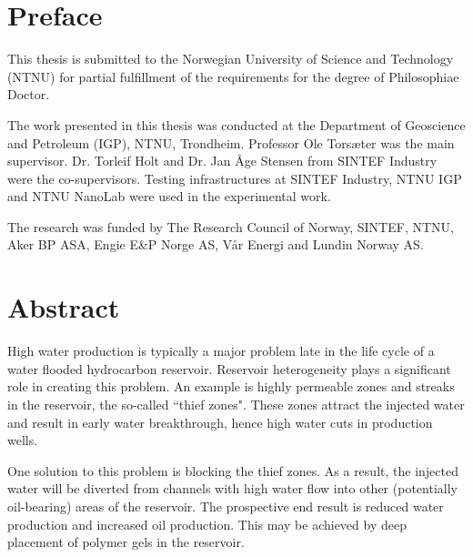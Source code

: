 
\clearpage{\thispagestyle{empty}\cleardoublepage}
\setcounter{page}{1}
\chapter*{Preface}

This thesis is submitted to the Norwegian University of Science and Technology (NTNU) for partial fulfillment of the requirements for the degree of Philosophiae Doctor.

The work presented in this thesis was conducted at the Department of Geoscience and Petroleum (IGP), NTNU, Trondheim. Professor Ole Torsæter was the main supervisor. Dr. Torleif Holt and Dr. Jan Åge Stensen from SINTEF Industry were the co-supervisors. Testing infrastructures at SINTEF Industry, NTNU IGP and NTNU NanoLab were used in the experimental work.  

The research was funded by The Research Council of Norway, SINTEF, NTNU, Aker BP ASA, Engie E\&P Norge AS, Vår Energi and Lundin Norway AS.


\clearpage{\thispagestyle{empty}\cleardoublepage}
\chapter*{Abstract}

High water production is typically a major problem late in the life cycle of a water flooded hydrocarbon reservoir. Reservoir heterogeneity plays a significant role in creating this problem. An example is highly permeable zones and streaks in the reservoir, the so-called ``thief zones". These zones attract the injected water and result in early water breakthrough, hence high water cuts in production wells. 

One solution to this problem is blocking the thief zones. As a result, the injected water will be diverted from channels with high water flow into other (potentially oil-bearing) areas of the reservoir. The prospective end result is reduced water production and increased oil production.  This may be achieved by deep placement of polymer gels in the reservoir. 

